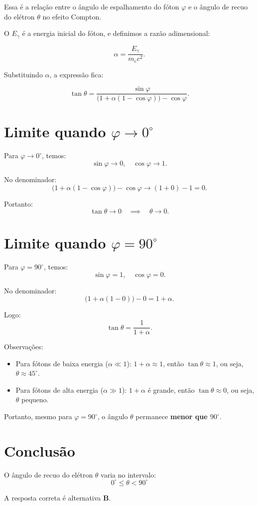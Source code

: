 \documentclass[a4paper,12pt]{article}
\begin{document}
\begin{flushleft}
Essa é a relação entre o ângulo de espalhamento do fóton \( \varphi \) e o ângulo de recuo do elétron \( \theta \) no efeito Compton.

O \(E_\gamma\) é a energia inicial do fóton, e definimos a razão adimensional:

\[
\alpha =
\frac{E_\gamma}{m_e c^2}.
\]

Substituindo \(\alpha\), a expressão fica:

\[
\tan\theta =
\frac{\sin\varphi}{
\big(1 + \alpha(1-\cos\varphi)\big) - \cos\varphi}.
\]

\section*{Limite quando \(\varphi \to 0^\circ\)}

Para \(\varphi \to 0^\circ\), temos:
\[
\sin\varphi \to 0, \quad \cos\varphi \to 1.
\]

No denominador:
\[
\big(1 + \alpha(1-\cos\varphi)\big) - \cos\varphi 
\to (1 + 0) - 1 = 0.
\]

Portanto:
\[
\tan\theta \to 0 \quad \implies \quad \theta \to 0.
\]

\section*{Limite quando \(\varphi = 90^\circ\)}

Para \(\varphi = 90^\circ\), temos:
\[
\sin\varphi = 1, \quad \cos\varphi = 0.
\]

No denominador:
\[
\big(1 + \alpha(1-0)\big) - 0 =
1 + \alpha.
\]

Logo:
\[
\tan\theta =
\frac{1}{1+\alpha}.
\]

Observações:
\begin{itemize}
    \item Para fótons de baixa energia (\(\alpha \ll 1\)): \(1+\alpha \approx1\), então \(\tan\theta\approx1\), ou seja, \(\theta\approx45^\circ\).
    \item Para fótons de alta energia (\(\alpha\gg1\)): \(1+\alpha\) é grande, então \(\tan\theta\approx0\), ou seja, \(\theta\) pequeno.
\end{itemize}

Portanto, mesmo para \(\varphi=90^\circ\), o ângulo \(\theta\) permanece \textbf{menor que \(90^\circ\)}.

\section*{Conclusão}

O ângulo de recuo do elétron \(\theta\) varia no intervalo:
\[
\boxed{0^\circ \leq \theta < 90^\circ}
\]


A resposta correta é alternativa \colorbox{green!50}{\textbf{B}}.
\end{flushleft}
\end{document}
